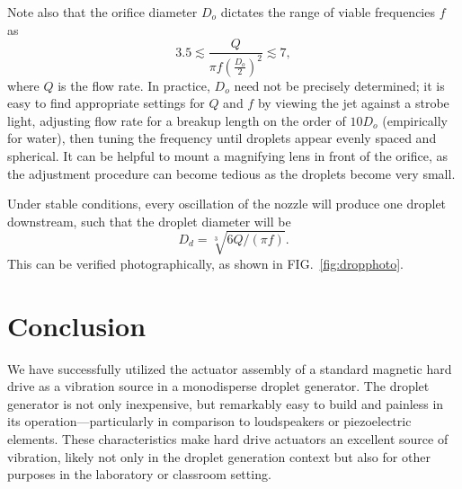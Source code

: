 \documentclass[aip,rsi,reprint,graphicx]{revtex4-1} %
\begin{document}
Note also that the orifice diameter $D_o$ dictates the range of viable
frequencies $f$ as 
\begin{equation}
    3.5 \lesssim \frac{Q}{\pi f \left(\frac{D_o}{2}\right)^2}
\lesssim 7,
\end{equation}
where $Q$ is the flow rate.\cite{Savart33, Rayleigh79} In
practice, $D_o$ need not be
precisely determined; it is easy to find appropriate settings for $Q$
and $f$ by viewing the jet against a strobe light, adjusting flow rate for a breakup
length on the order of $10 D_o$ (empirically for water), then tuning the frequency
until droplets appear evenly spaced and spherical. It can be helpful to mount a
magnifying lens in front of the orifice, as the adjustment procedure can become
tedious as the droplets become very small.

Under stable conditions, every oscillation of the nozzle will produce one droplet
downstream,\cite{Rayleigh79} such that the droplet diameter will be 
\begin{equation}D_d = \sqrt[3]{6Q/(\pi f)}.\end{equation} This can be verified photographically, as shown in
FIG.~\ref{fig:dropphoto}.

\section{Conclusion}
We have successfully utilized the actuator assembly of a standard magnetic hard
drive as a vibration source in a monodisperse droplet generator. The droplet
generator is not only inexpensive, but remarkably easy to build and painless in
its operation---particularly in comparison to loudspeakers or piezoelectric elements.
These characteristics make hard drive actuators an excellent source of
vibration, likely not only in the droplet generation context but also for other
purposes in the laboratory or classroom setting.

\end{document}
